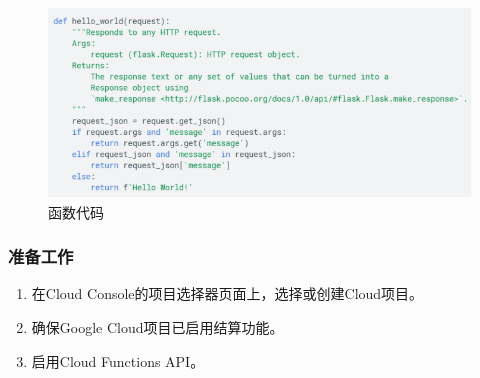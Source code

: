 \begin{figure}[!htbp]
	\centering
	\includegraphics[width=0.7\linewidth]{figs/14.png}
	\caption{函数代码}
	\label{fig14}	
\end{figure}	

\begin{multicols}{2}
	\subsubsection{准备工作} 
	\begin{enumerate}
		\item 在Cloud Console的项目选择器页面上，选择或创建Cloud项目。
		\item 确保Google Cloud项目已启用结算功能。
		\item 启用Cloud Functions API。
	\end{enumerate}
	

\end{multicols}
